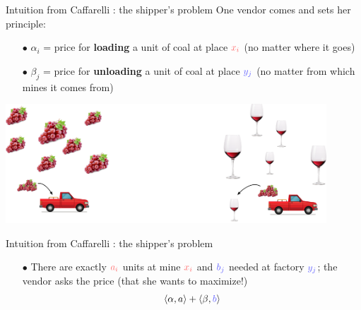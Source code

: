 \documentclass[pdf,aspectratio=169,10pt]{beamer}
\begin{document}
\begin{frame}{Intuition from Caffarelli : the shipper's problem}
One vendor comes and sets her principle:
\begin{itemize}
\item[$\bullet$] $\alpha_i$ = price for \textbf{loading} a unit of coal at place $\er{x_i}$ (no matter where it goes)
\item[$\bullet$] $\beta_j$ = price for \textbf{unloading} a unit of coal at place $\eb{y_j}$ (no matter from which mines it comes from)
\end{itemize}

\begin{center}
\includegraphics[width=0.9\textwidth]{../img/wine_load2.pdf}
\end{center}

\end{frame}

\begin{frame}{Intuition from Caffarelli : the shipper's problem}

\begin{itemize}
\item[$\bullet$] There are exactly $\er{a_i}$ units at mine $\er{x_i}$ and $\eb{b_j}$ needed at factory $\eb{y_j}$; the vendor asks the price (that she wants to maximize!)
$$\langle\alpha, {a}\rangle + \langle\beta, \eb{b}\rangle$$
\end{itemize}

\end{frame}
\end{document}
